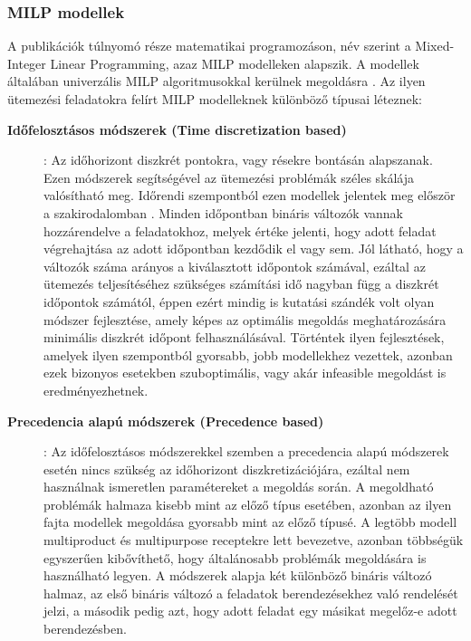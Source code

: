 \subsubsection{MILP modellek}
A publikációk túlnyomó része matematikai programozáson, név szerint a Mixed-Integer Linear Programming, azaz MILP modelleken alapszik.
A modellek általában univerzális MILP algoritmusokkal kerülnek megoldásra \cite{9780471283669}. 
Az ilyen ütemezési feladatokra felírt MILP modelleknek különböző típusai léteznek:
\begin{description}
\item[\textbf{Időfelosztásos módszerek (Time discretization based)}]: Az időhorizont diszkrét pontokra, vagy résekre bontásán alapszanak. Ezen módszerek segítségével az ütemezési problémák széles skálája valósítható meg.
Időrendi szempontból ezen modellek jelentek meg először a szakirodalomban \cite{KONDILI1993211}.
Minden időpontban bináris változók vannak hozzárendelve a feladatokhoz, melyek értéke jelenti, hogy adott feladat végrehajtása az adott időpontban kezdődik el vagy sem.
Jól látható, hogy a változók száma arányos a kiválasztott időpontok számával, ezáltal az ütemezés teljesítéséhez szükséges számítási idő nagyban függ a diszkrét időpontok számától, éppen ezért mindig is kutatási szándék volt olyan módszer fejlesztése, amely képes az optimális megoldás meghatározására minimális diszkrét időpont felhasználásával.
Történtek ilyen fejlesztések, amelyek ilyen szempontból gyorsabb, jobb modellekhez vezettek, azonban ezek bizonyos esetekben szuboptimális, vagy akár infeasible megoldást is eredményezhetnek.
\item[\textbf{Precedencia alapú módszerek (Precedence based)}]: Az időfelosztásos módszerekkel szemben a precedencia alapú módszerek esetén nincs szükség az időhorizont diszkretizációjára, ezáltal nem használnak ismeretlen paramétereket a megoldás során.
A megoldható problémák halmaza kisebb mint az előző típus esetében, azonban az ilyen fajta modellek megoldása gyorsabb mint az előző típusé.
A legtöbb modell multiproduct és multipurpose receptekre lett bevezetve, azonban többségük egyszerűen kibővíthető, hogy általánosabb problémák megoldására is használható legyen.
A módszerek alapja két különböző bináris változó halmaz, az első bináris változó a feladatok berendezésekhez való rendelését jelzi, a második pedig azt, hogy adott feladat egy másikat megelőz-e adott berendezésben.
\end{description}
